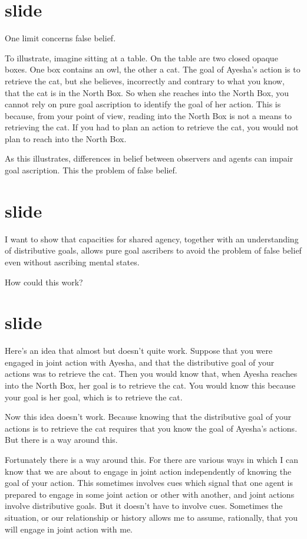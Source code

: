 \documentclass[12pt,\papersize]{extarticle}
\begin{document}
\section{slide}
One limit concerns false belief.

To illustrate, 
imagine sitting at a table.
On the table are two closed opaque boxes.
One box contains an owl, the other a cat.
The goal of Ayesha's action is to retrieve the cat,
but she believes, incorrectly and contrary to what you know,
that the cat is in the North Box.
So when she reaches into the North Box,
you cannot rely on pure goal ascription to identify the goal of her action.
This is because, from your point of view, 
reading into the North Box is not a means to retrieving the cat.
If you had to plan an action to retrieve the cat, you would not plan to reach into the North Box.

As this illustrates,
differences in belief between observers and agents can 
impair goal ascription.
This the problem of false belief.


\section{slide}
I want to show that
capacities for shared agency, 
together with an understanding of distributive goals,
allows pure goal ascribers to avoid the problem of false belief
even without ascribing mental states.

How could this work?



\section{slide}
Here's an idea that almost but doesn't quite work.
Suppose that you were engaged in joint action with Ayesha,
and that the distributive goal of your actions was to retrieve the cat.
Then you would know that, when Ayesha reaches into the North Box, her goal is to retrieve the cat.
You would know this because your goal is her goal, which is to retrieve the cat.

Now this idea doesn't work.
Because knowing that the distributive goal of your actions is to retrieve the cat requires that you know the goal of Ayesha's actions.
But there is a way around this.

Fortunately there is a way around this.  
For there are various ways in which I can know that we are about to engage in joint action independently of knowing the goal of your action.
This sometimes involves cues which signal that one agent is prepared to engage in some joint action or other with another,
and joint actions involve distributive goals.  
But it doesn't have to involve cues.
Sometimes the situation, or our relationship or history allows me to assume, rationally, that you will engage in joint action with me.
\end{document}
